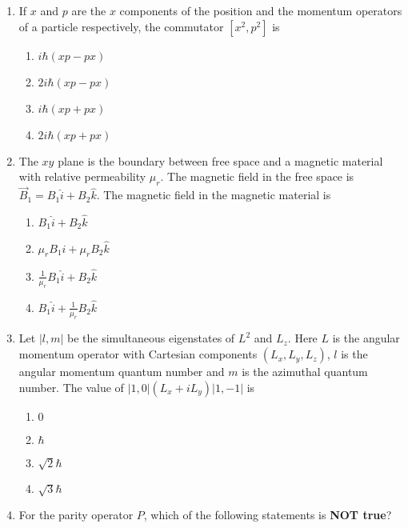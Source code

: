 \documentclass{article}
\newcommand{\brak}[1]{\left( #1 \right)}
\newcommand{\sbrak}[1]{\left[ #1 \right]}
\newcommand{\abs}[1]{\left| #1 \right|}
\begin{document}
\begin{enumerate}
\begin{figure}[!ht]
\label{fig:my_label}
\end{figure}
   

    \item If $x$ and $p$ are the $x$ components of the position and the momentum operators of a particle respectively, the commutator $\sbrak{x^2, p^2}$  
 is

    \begin{enumerate}
        \item $i\hbar\brak{xp - px}$
        \item $2i\hbar\brak{xp - px}$
        \item $i\hbar\brak{xp + px}$
        \item $2i\hbar\brak{xp + px}$
    \end{enumerate}

    \item The $xy$ plane is the boundary between free space and a magnetic material with relative permeability $\mu_r$. The magnetic field in the free space  
 is $\vec{B}_1 = B_1 \hat{i} + B_2 \hat{k}$. The magnetic field in the magnetic material is

    \begin{enumerate}
        \item $B_1 \hat{i} + B_2 \hat{k}$
        \item $\mu_r B_1 \hat{i} + \mu_r B_2 \hat{k}$
        \item $\frac{1}{\mu_r} B_1 \hat{i} + B_2 \hat{k}$
        \item $B_1 \hat{i} + \frac{1}{\mu_r} B_2 \hat{k}$
    \end{enumerate}

    \item Let $\abs{l,m}$ be the simultaneous eigenstates of $L^2$ and $L_z$. Here $L$ is the angular momentum operator with Cartesian components $\brak{L_x, L_y, L_z}$, $l$ is the angular momentum quantum number and $m$ is the azimuthal quantum number. The value of $\abs{1,0}\brak{L_x + iL_y}\abs{1,-1}$ is

    \begin{enumerate}
        \item $0$
        \item $\hbar$
        \item $\sqrt{2}\hbar$
        \item $\sqrt{3}\hbar$
    \end{enumerate}

\item For the parity operator $P$, which of the following statements is \textbf{NOT true}?


\end{enumerate}
\end{document}
